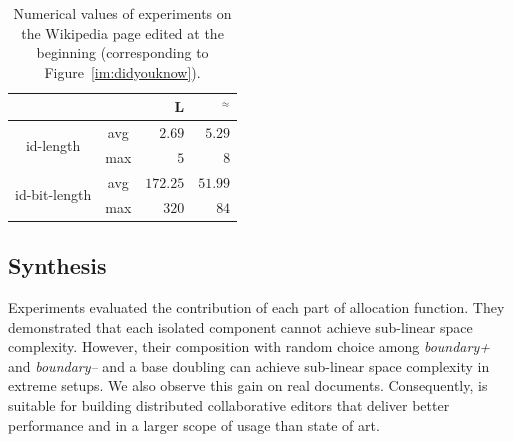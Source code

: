 \begin{table}[h]
\addtolength{\belowcaptionskip}{-15pt}
  \begin{center}
    \begin{tabular}{|c|c|r|r|}
      \cline{3-4}
      \multicolumn{2}{c|}{} &\textbf{L} &\textbf{\NAME{}}$^\approx$\\
      \cline{3-4}
      \hline
      \multirow{2}{*}{id-length} & avg & $2.69$ & $5.29$ \\
      \cline{2-4}
     &  max & $5$ & $8$ \\
      \hline
      \hline
      \multirow{2}{*}{id-bit-length} & avg & $172.25$ & $51.99$\\
      \cline{2-4}
      & max & $320$ & $84$ \\
      \hline
    \end{tabular}
    \caption{Numerical values of experiments on the Wikipedia page edited at
      the beginning (corresponding to Figure~\ref{im:didyouknow}).}
    \label{tab:didyouknow}
  \end{center}
\end{table}

\subsection{Synthesis}

Experiments evaluated the contribution of each part of \NAME{} allocation
function. They demonstrated that each isolated component cannot achieve
sub-linear space complexity. However, their composition with random choice
among \emph{boundary+} and \emph{boundary--} and a base doubling can achieve
sub-linear space complexity in extreme setups. We also observe this gain on
real documents. Consequently, \NAME{} is suitable for building distributed
collaborative editors that deliver better performance and in a larger scope of
usage than state of art.


